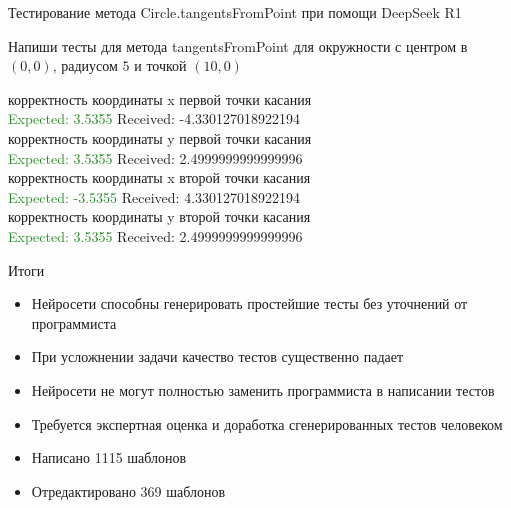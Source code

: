 \documentclass[aspectratio=169,12pt]{beamer}
\newcommand{\greencheck}{{\color{ForestGreen}\Checkmark}}
\newcommand{\redsolid}{{\color{BrickRed}\XSolid}}
\begin{document}
\begin{frame}[fragile]{Тестирование метода Circle.tangentsFromPoint при помощи DeepSeek R1}
	\begin{leftBox}
		Напиши тесты для метода tangentsFromPoint для окружности с центром в $(0,0)$, радиусом $5$ и точкой $(10, 0)$
	\end{leftBox}
	
	\begin{rightBox}
		\redsolid корректность координаты x первой точки касания
		\\\textcolor{ForestGreen}{Expected: 3.5355} 
		\textcolor{BrickRed}{Received: -4.330127018922194} 
		\\\redsolid корректность координаты y первой точки касания
		\\\textcolor{ForestGreen}{Expected: 3.5355} 
		\textcolor{BrickRed}{Received: 2.4999999999999996} 
		\\\redsolid корректность координаты x второй точки касания
		\\\textcolor{ForestGreen}{Expected: -3.5355} 
		\textcolor{BrickRed}{Received: 4.330127018922194} 
		\\\redsolid корректность координаты y второй точки касания
		\\\textcolor{ForestGreen}{Expected: 3.5355} 
		\textcolor{BrickRed}{Received: 2.4999999999999996} 
	\end{rightBox}
\end{frame}

\begin{frame}{Итоги}
	\begin{itemize}
		\item Нейросети способны генерировать простейшие тесты без уточнений от программиста
		\item При усложнении задачи качество тестов существенно падает
		\item Нейросети не могут полностью заменить программиста в написании тестов
		\item Требуется экспертная оценка и доработка сгенерированных тестов человеком
		\item Написано 1115 шаблонов 
		\item Отредактировано 369 шаблонов
	\end{itemize}
\end{frame}
\end{document}
